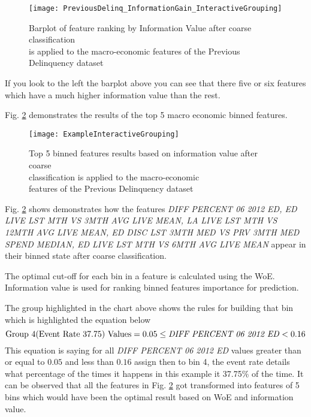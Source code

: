 \begin{figure}[H]
	\texttt{[image: PreviousDelinq\_InformationGain\_InteractiveGrouping]}
	\caption{Barplot of feature ranking by Information Value after coarse classification \\is applied to the macro-economic features of the Previous Delinquency dataset}
	\label{fig:Information Value using SAS Previous Delinquency Features}
\end{figure}

If you look to the left the barplot above you can see that there five or six features which have a much higher information value than the rest.


Fig. \ref{fig:Interactive Grouping Diff Percent 06 2012 ED} demonstrates the results of the top 5 macro economic binned features.
\begin{figure}[H]
	\texttt{[image: ExampleInteractiveGrouping]}
	\caption{Top 5 binned features results based on information value after coarse \\classification is applied to the macro-economic\\ features of the Previous Delinquency dataset}
	\label{fig:Interactive Grouping Diff Percent 06 2012 ED}
\end{figure}

Fig. \ref{fig:Interactive Grouping Diff Percent 06 2012 ED} shows demonstrates how the features  \textit{DIFF PERCENT 06 2012 ED, ED LIVE LST MTH VS 3MTH AVG LIVE MEAN, LA LIVE LST MTH VS 12MTH AVG LIVE MEAN, ED DISC LST 3MTH MED VS PRV 3MTH MED SPEND MEDIAN, ED LIVE LST MTH VS 6MTH AVG LIVE MEAN} appear in their binned state after coarse classification. 

The optimal cut-off for each bin in a feature is calculated using the WoE. Information value is used for ranking binned features importance for prediction. 

The group highlighted in the chart above shows the rules for building that bin which is highlighted the equation below
\[
\text{Group 4(Event Rate 37.75) Values} = 0.05 \leq \text{\textit{DIFF PERCENT 06 2012 ED}} < 0.16
\]
This equation is saying for all \textit{DIFF PERCENT 06 2012 ED} values greater than or equal to $0.05$ and less than $0.16$ assign then to bin 4, the event rate details what percentage of the times it happens in this example it 37.75\% of the time. It can be observed that all the features in Fig. \ref{fig:Interactive Grouping Diff Percent 06 2012 ED} got transformed into features of 5 bins which would have been the optimal result based on WoE and information value.

